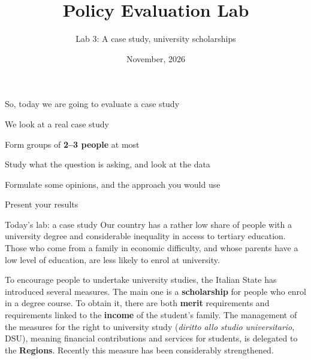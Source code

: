 \documentclass[aspectratio=169,xcolor=table]{beamer}
\title[Policy Evaluation Lab]{Policy Evaluation Lab}
\subtitle[Lab 3]{Lab 3: A case study, university scholarships}
\date[\pelYear]{November, 2026}
\begin{document}
\frame{\titlepage}

\begin{frame}{So, today we are going to evaluate a case study}
\be
  \item We look at a real case study
  \item Form groups of \textbf{2--3 people} at most
  \item Study what the question is asking, and look at the data
  \item Formulate some opinions, and the approach you would use
  \item Present your results
\ee
\end{frame}

\begin{frame}{Today's lab: a case study}
\small
Our country has a rather low share of people with a university degree and considerable inequality in access to tertiary education. Those who come from a family in economic difficulty, and whose parents have a low level of education, are less likely to enrol at university.

\vspace{0.15cm}
To encourage people to undertake university studies, the Italian State has introduced several measures. The main one is a \textbf{scholarship} for people who enrol in a degree course. To obtain it, there are both \textbf{merit} requirements and requirements linked to the \textbf{income} of the student's family. The management of the measures for the right to university study (\textit{diritto allo studio universitario}, DSU), meaning financial contributions and services for students, is delegated to the \textbf{Regions}. Recently this measure has been considerably strengthened.
\end{frame}
\end{document}
